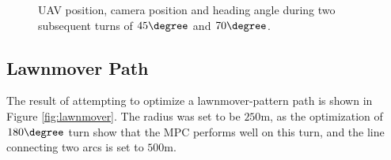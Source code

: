 \begin{figure}
	\caption{UAV position, camera position and heading angle during two subsequent turns of $45\degree$ and $70\degree$.}
	\label{fig:paths_cur_150m}
\end{figure}


\subsection{Lawnmover Path}

The result of attempting to optimize a lawnmover-pattern path is shown in Figure \ref{fig:lawnmover}. The radius was set to be $250$m, as the optimization of $180\degree$ turn show that the MPC performs well on this turn, and the line connecting two arcs is set to $500$m.

